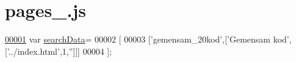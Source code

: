 \hypertarget{pages__0_8js_source}{}\section{pages\+\_.\+js}
\label{pages__0_8js_source}

\begin{DoxyCode}
\hypertarget{pages__0_8js_source.tex_l00001}{}\hyperlink{pages__0_8js_ad01a7523f103d6242ef9b0451861231e}{00001} var \hyperlink{pages__0_8js_ad01a7523f103d6242ef9b0451861231e}{searchData}=
00002 [
00003   [\textcolor{stringliteral}{'gemensam\_20kod'},[\textcolor{stringliteral}{'Gemensam kod'},[\textcolor{stringliteral}{'../index.html'},1,\textcolor{stringliteral}{''}]]]
00004 ];
\end{DoxyCode}
